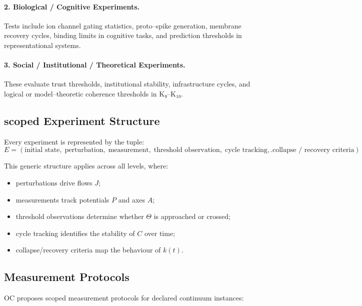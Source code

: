 \paragraph{2. Biological / Cognitive Experiments.}
Tests include ion channel gating statistics, proto–spike generation,
membrane recovery cycles, binding limits in cognitive tasks, and prediction
thresholds in representational systems.

\paragraph{3. Social / Institutional / Theoretical Experiments.}
These evaluate trust thresholds, institutional stability, infrastructure
cycles, and logical or model–theoretic coherence thresholds in K₉–K₁₀.


\subsection{scoped Experiment Structure}

Every experiment is represented by the tuple:
\[
   E = (\text{initial state},\;
         \text{perturbation},\;
         \text{measurement},\;
         \text{threshold observation},\;
         \text{cycle tracking},\;
         \text{collapse / recovery criteria}).
\]

This generic structure applies across all levels, where:

\begin{itemize}
    \item perturbations drive flows $J$;
    \item measurements track potentials $P$ and axes $A$;
    \item threshold observations determine whether $\Theta$ is approached or
          crossed;
    \item cycle tracking identifies the stability of $C$ over time;
    \item collapse/recovery criteria map the behaviour of $k(t)$.
\end{itemize}


\subsection{Measurement Protocols}

OC proposes scoped measurement protocols for declared continuum instances:

